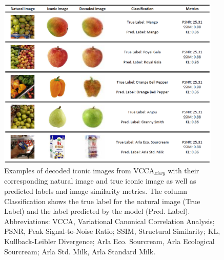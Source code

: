 
\begin{figure}[t]
    \centering
    \includegraphics[width=0.95\textwidth]{figures_and_tables/figure10.png}
    \caption{Examples of decoded iconic images from VCCA$_{xiwy}$ with their corresponding natural image and true iconic image as well as predicted labels and image similarity metrics. The column Classification shows the true label for the natural image (True Label) and the label predicted by the model (Pred. Label). Abbreviations: VCCA, Variational Canonical Correlation Analysis; PSNR, Peak Signal-to-Noise Ratio; SSIM, Structural Similarity; KL, Kullback-Leibler Divergence; Arla Eco. Sourcream, Arla Ecological Sourcream; Arla Std. Milk, Arla Standard Milk.}
    \label{fig:decoded_iconic_images_with_metrics}
\end{figure}